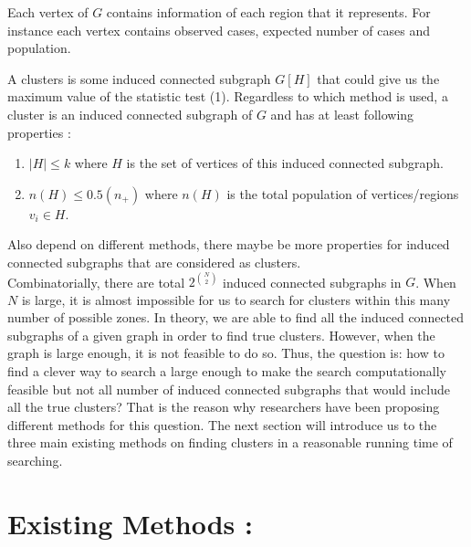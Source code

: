 \documentclass[12pt]{article}
\begin{document}
				Each vertex of $G$ contains information of each region that it represents. For instance  each vertex contains observed cases, expected number of cases and population.
				
				A clusters is some induced connected subgraph $G[H]$ that could give us the maximum value of the statistic test (1). Regardless to which method is used, a cluster is an induced connected subgraph of $G$ and has at least following properties : \\
				\begin{enumerate}
					
					\item $|H| \leq k $ where $H$ is the set of vertices of this induced connected subgraph.
					\item $n(H) \leq 0.5(n_+)$ where $n(H)$ is the total population of vertices/regions $v_i \in H$. 
				\end{enumerate}
				Also depend on different methods, there maybe be more properties for induced connected subgraphs that are considered as clusters.\\ 	
			
				Combinatorially, there are total $2^ {\binom{N}{2}}$ induced connected subgraphs in $G$. When $N$ is large, it is almost impossible for us to search for clusters within this many number of possible zones. In theory, we are able to find all the induced connected subgraphs of a given graph in order to find true clusters. However, when the graph is large enough, it is not feasible to do so. Thus, the question is: how to find a clever way to search a large enough to make the search computationally feasible but not all number of induced connected subgraphs that would include all the true clusters? That is the reason why researchers have been proposing different methods for this question. The next section will introduce us to the three main existing methods on finding clusters in a reasonable running time of searching.\\
			
			
\section{Existing Methods :} 
			
\end{document}

